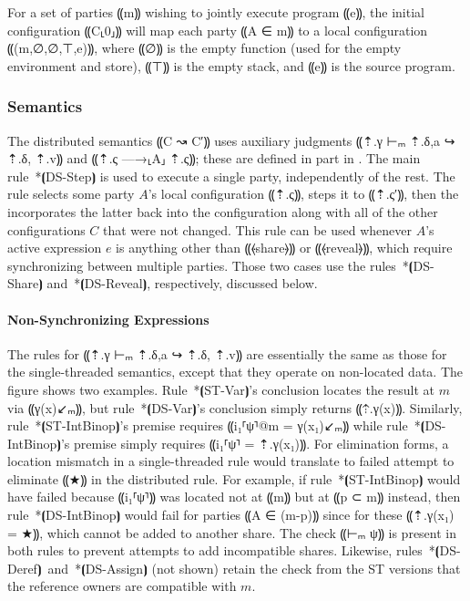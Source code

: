 For a set of parties ⸨m⸩ wishing to jointly execute program ⸨e⸩, the
initial configuration ⸨C⸤0⸥⸩ will map each party ⸨A ∈ m⸩ to a local
configuration ⸨(m,∅,∅,⊤,e)⸩, where ⸨∅⸩ is the empty function (used for
the empty environment and store), ⸨⊤⸩ is the empty stack, and ⸨e⸩ is
the source program.

\subsubsection{Semantics}
\label{subsubsec:mpc-design-dist-sem}

The distributed semantics ⸨C ↝ C′⸩ uses auxiliary judgments ⸨⇡.γ ⊢ₘ ⇡.δ,a ↪
⇡.δ, ⇡.v⸩ and ⸨⇡.ς —→⸤A⸥ ⇡.ς⸩; these are defined in part in
. The main rule~*⦗DS-Step⦘ is used to execute a single party,
independently of the rest. The rule selects some party $A$'s local
configuration ⸨⇡.ς⸩, steps it to ⸨⇡.ς′⸩, then the incorporates the
latter back into the configuration along with all of the other
configurations $C$ that were not changed. This rule can be used
whenever $A$'s active expression $e$ is anything other than ⸨⦑share⦒⸩ or
⸨⦑reveal⦒⸩, which require synchronizing between multiple parties.
Those two cases use the rules~*⦗DS-Share⦘ and~*⦗DS-Reveal⦘,
respectively, discussed below.

\paragraph*{Non-Synchronizing Expressions} \label{para:mpc-design-dist-sem-nonsync}
%
The rules for ⸨⇡.γ ⊢ₘ ⇡.δ,a ↪ ⇡.δ, ⇡.v⸩ are essentially the same as
those for the single-threaded semantics, except that they operate on
non-located data. The figure shows two examples. Rule~*⦗ST-Var⦘'s
conclusion locates the
result at $m$ via ⸨γ(x)↙ₘ⸩, but rule~*⦗DS-Var⦘'s conclusion simply
returns ⸨⇡.γ(x)⸩. Similarly, rule~*⦗ST-IntBinop⦘'s premise requires
⸨i₁⸢ψ⸣@m = γ(x₁)↙ₘ⸩ while rule~*⦗DS-IntBinop⦘'s premise simply
requires ⸨i₁⸢ψ⸣ = ⇡.γ(x₁)⸩. For elimination forms, a location mismatch
in a single-threaded rule would translate to failed attempt to
eliminate ⸨★⸩ in the distributed rule. For example, if rule~*⦗ST-IntBinop⦘
would have failed because ⸨i₁⸢ψ⸣⸩ was located not at ⸨m⸩ but at ⸨p ⊂
m⸩ instead, then rule~*⦗DS-IntBinop⦘ would fail for parties ⸨A ∈ (m-p)⸩
since for these ⸨⇡.γ(x₁) = ★⸩, which cannot be added to another
share. The check ⸨⊢ₘ ψ⸩ is present in both rules to prevent attempts
to add incompatible shares. Likewise,
rules~*⦗DS-Deref⦘~and~*⦗DS-Assign⦘ (not shown) retain the check from the ST
versions that the reference owners are compatible with $m$.

